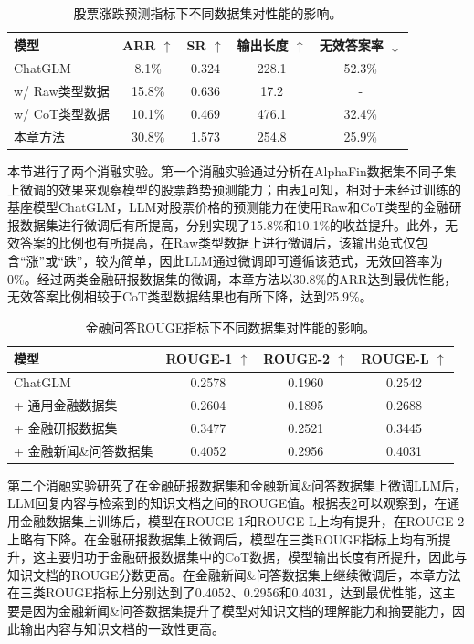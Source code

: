 \begin{table}
	\caption{\label{dataset_ablation_trend}股票涨跌预测指标下不同数据集对性能的影响。}
	\centering{}%
	\small 
	\begin{tabular}{lcccc}
		\toprule[2pt]
		模型 & ARR $\uparrow$ & SR $\uparrow$ & 输出长度 $\uparrow$ & 无效答案率 $\downarrow$ \\
		\hline
		ChatGLM & 8.1\% & 0.324 & 228.1 & 52.3\% \\
		w/ Raw类型数据 & 15.8\% & 0.636 & 17.2 & - \\
		w/ CoT类型数据 & 10.1\% & 0.469 & 476.1 & 32.4\% \\
		本章方法 & 30.8\% & 1.573 & 254.8 & 25.9\% \\
		\bottomrule[2pt]
	\end{tabular}
\end{table}

本节进行了两个消融实验。第一个消融实验通过分析在AlphaFin数据集不同子集上微调的效果来观察模型的股票趋势预测能力；由表\ref{dataset_ablation_trend}可知，相对于未经过训练的基座模型ChatGLM，LLM对股票价格的预测能力在使用Raw和CoT类型的金融研报数据集进行微调后有所提高，分别实现了15.8\%和10.1\%的收益提升。此外，无效答案的比例也有所提高，在Raw类型数据上进行微调后，该输出范式仅包含“涨”或“跌”，较为简单，因此LLM通过微调即可遵循该范式，无效回答率为0\%。经过两类金融研报数据集的微调，本章方法以30.8\%的ARR达到最优性能，无效答案比例相较于CoT类型数据结果也有所下降，达到25.9\%。

\begin{table}
	\caption{\label{dataset_ablation_qa}金融问答ROUGE指标下不同数据集对性能的影响。}
	\centering{}%
	\small 
	\begin{tabular}{lccc}
		\toprule[2pt]
		模型 & ROUGE-1 $\uparrow$ & ROUGE-2 $\uparrow$ & ROUGE-L $\uparrow$ \\
		\hline
		ChatGLM & 0.2578 & 0.1960 & 0.2542 \\
		+ 通用金融数据集 & 0.2604 & 0.1895 & 0.2688 \\
		+ 金融研报数据集 & 0.3477 & 0.2521 & 0.3445 \\
		+ 金融新闻\&问答数据集 & 0.4052 & 0.2956 & 0.4031 \\
		\bottomrule[2pt]
	\end{tabular}
\end{table}

第二个消融实验研究了在金融研报数据集和金融新闻\&问答数据集上微调LLM后，LLM回复内容与检索到的知识文档之间的ROUGE值。根据表\ref{dataset_ablation_qa}可以观察到，在通用金融数据集上训练后，模型在ROUGE-1和ROUGE-L上均有提升，在ROUGE-2上略有下降。在金融研报数据集上微调后，模型在三类ROUGE指标上均有所提升，这主要归功于金融研报数据集中的CoT数据，模型输出长度有所提升，因此与知识文档的ROUGE分数更高。在金融新闻\&问答数据集上继续微调后，本章方法在三类ROUGE指标上分别达到了0.4052、0.2956和0.4031，达到最优性能，这主要是因为金融新闻\&问答数据集提升了模型对知识文档的理解能力和摘要能力，因此输出内容与知识文档的一致性更高。

